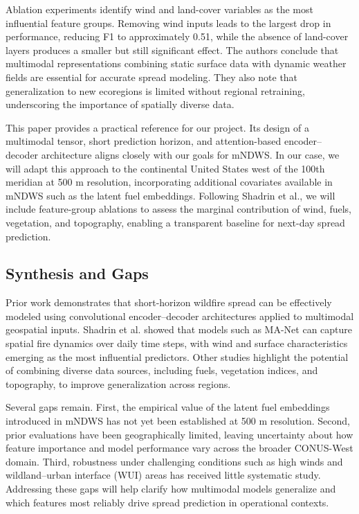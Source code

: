 \documentclass[conference]{IEEEtran}
\begin{document}
Ablation experiments identify wind and land-cover variables as the most influential feature groups. Removing wind inputs leads to the largest drop in performance, reducing F1 to approximately 0.51, while the absence of land-cover layers produces a smaller but still significant effect. The authors conclude that multimodal representations combining static surface data with dynamic weather fields are essential for accurate spread modeling. They also note that generalization to new ecoregions is limited without regional retraining, underscoring the importance of spatially diverse data.

This paper provides a practical reference for our project. Its design of a multimodal tensor, short prediction horizon, and attention-based encoder–decoder architecture aligns closely with our goals for mNDWS. In our case, we will adapt this approach to the continental United States west of the 100th meridian at 500 m resolution, incorporating additional covariates available in mNDWS such as the latent fuel embeddings. Following Shadrin et al., we will include feature-group ablations to assess the marginal contribution of wind, fuels, vegetation, and topography, enabling a transparent baseline for next-day spread prediction.

\subsection{Synthesis and Gaps}
Prior work demonstrates that short-horizon wildfire spread can be effectively modeled using convolutional encoder–decoder architectures applied to multimodal geospatial inputs. Shadrin et al. \cite{shadrin2024scientificreports} showed that models such as MA-Net can capture spatial fire dynamics over daily time steps, with wind and surface characteristics emerging as the most influential predictors. Other studies highlight the potential of combining diverse data sources, including fuels, vegetation indices, and topography, to improve generalization across regions.

Several gaps remain. First, the empirical value of the latent fuel embeddings introduced in mNDWS has not yet been established at 500 m resolution. Second, prior evaluations have been geographically limited, leaving uncertainty about how feature importance and model performance vary across the broader CONUS-West domain. Third, robustness under challenging conditions such as high winds and wildland–urban interface (WUI) areas has received little systematic study. Addressing these gaps will help clarify how multimodal models generalize and which features most reliably drive spread prediction in operational contexts.
\end{document}
